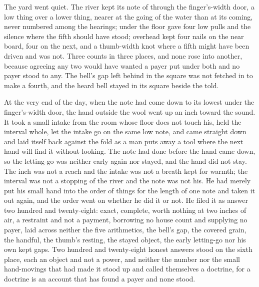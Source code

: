 \scenebreak

The yard went quiet. The river kept its note of  through the finger's-width door, a low thing over a lower thing, nearer at the going of the water than at its coming, never numbered among the hearings; under the floor  gave four low pulls and the silence where the fifth should have stood; overhead  kept four nails on the near board, four on the next, and a thumb-width knot where a fifth might have been driven and was not. Three counts in three places, and none rose into another, because agreeing any two would have wanted a payer put under both and no payer stood to any. The bell's gap left behind in the square was not fetched in to make a fourth, and the heard bell stayed in its square beside the told.

At the very end of the day, when the note had come down to its lowest under the finger's-width door, the hand outside the wool went up an inch toward the sound. It took a small intake from the room whose floor does not touch his, held the interval whole, let the intake go on the same low note, and came straight down and laid itself back against the fold as a man puts away a tool where the next hand will find it without looking. The note had done before the hand came down, so the letting-go was neither early again nor stayed, and the hand did not stay. The inch was not a reach and the intake was not a breath kept for warmth; the interval was not a stopping of the river and the note was not his. He had merely put his small hand into the order of things for the length of one note and taken it out again, and the order went on whether he did it or not. He filed it as answer two hundred and twenty-eight: exact, complete, worth nothing at two inches of air, a restraint and not a payment, borrowing no house count and supplying no payer, laid across neither the five arithmetics, the bell's gap, the covered grain, the handful, the thumb's resting, the stayed object, the early letting-go nor his own kept gaps. Two hundred and twenty-eight honest answers stood on the sixth place, each an object and not a power, and neither the number nor the small hand-movings that had made it stood up and called themselves a doctrine, for a doctrine is an account that has found a payer and none stood.

